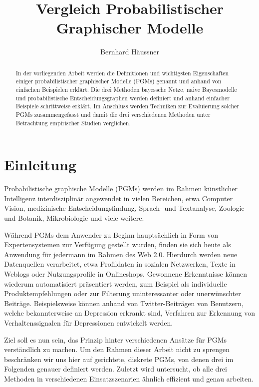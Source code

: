 \documentclass{llncs}
\title{Vergleich Probabilistischer Graphischer Modelle}
\author{Bernhard Häussner}
\institute{LS für Künstliche Intelligenz und Angewandte Informatik der Universität Würzburg}
\begin{document}
\maketitle

\begin{abstract}
In der vorliegenden Arbeit werden die Definitionen und wichtigsten Eigenschaften einiger probabilistischer graphischer Modelle (PGMs) genannt und anhand von einfachen Beispielen erklärt. Die drei Methoden bayessche Netze, naive Bayesmodelle und probabilistische Entscheidungsgraphen werden definiert und anhand einfacher Beispiele schrittweise erklärt. Im Anschluss werden Techniken zur Evaluierung solcher PGMs zusammengefasst und damit die drei verschiedenen Methoden unter Betrachtung empirischer Studien verglichen. 
\end{abstract}


\section{Einleitung}

Probabilistische graphische Modelle (PGMs) werden im Rahmen künstlicher Intelligenz interdisziplinär angewendet in vielen Bereichen, etwa Computer Vision, medizinische Entscheidungsfindung, Sprach- und Textanalyse, Zoologie und Botanik, Mikrobiologie und viele weitere. 

Während PGMs dem Anwender zu Beginn hauptsächlich in Form von Expertensystemen zur Verfügung gestellt wurden, finden sie sich heute als Anwendung für jedermann im Rahmen des Web 2.0. Hierdurch werden neue Datenquellen verarbeitet, etwa Profildaten in sozialen Netzwerken, Texte in Weblogs oder Nutzungsprofile in Onlineshops. Gewonnene Erkenntnisse können wiederum automatisiert präsentiert werden, zum Beispiel als individuelle Produktempfehlungen oder zur Filterung uninteressanter oder unerwünschter Beiträge. Beispielsweise können anhand von Twitter-Beiträgen von Benutzern, welche bekannterweise an Depression erkrankt sind, Verfahren zur Erkennung von Verhaltenssignalen für Depressionen entwickelt werden\cite{dechoudhury2013predicting}.

Ziel soll es nun sein, das Prinzip hinter verschiedenen Ansätze für PGMs verständlich zu machen. Um den Rahmen dieser Arbeit nicht zu sprengen beschränken wir uns hier auf gerichtete, diskrete PGMs, von denen drei im Folgenden genauer definiert werden. Zuletzt wird untersucht, ob alle drei Methoden in verschiedenen Einsatzszenarien ähnlich effizient und genau arbeiten. 
\end{document}
